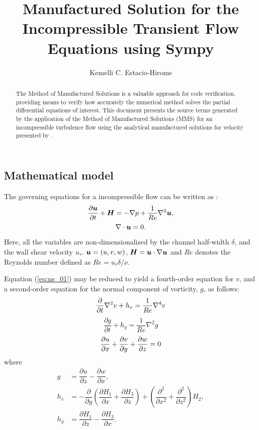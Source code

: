 \documentclass[10pt]{article}
\title{Manufactured Solution for the Incompressible Transient Flow Equations using Sympy}
\author{Kemelli C. Estacio-Hiroms}
\newcommand{\diff}[2] {\dfrac{\partial #1}{\partial #2}}
\newcommand{\bv}[1]{\ensuremath{\mbox{\boldmath$ #1 $}}}
\begin{document}
\begin{landscape}
	
\maketitle

\begin{abstract}
The Method of Manufactured Solutions is a valuable approach for code verification, providing means to verify how accurately the numerical method solves the partial differential equations of interest.
This document presents the source terms generated by the application of the Method of Manufactured Solutions (MMS) for an incompressible turbulence flow  using the analytical manufactured solutions for velocity presented by \citet{Rhys2011}.
\end{abstract}





\section{Mathematical model}
The governing equations for a incompressible flow can be written as \citep{Kim1987}:
\begin{equation}
 \label{eq:ns_01}
\diff{\bv{u}}{t}  +\bv{H}= -\nabla p+  \dfrac{1}{Re}\nabla^2 \bv{u},
\end{equation}
\begin{equation}
 \label{eq:ns_02}
\nabla \cdot \bv{u} = 0.
\end{equation}

Here, all the variables are non-dimensionalized by the channel half-width $\delta$, and the wall shear velocity $u_\tau$. $\bv{u}=(u,v,w)$, $\bv{H}=\bv{u}\cdot\nabla\bv{u}$ and $Re$ denotes the Reynolds number defined as $Re=u_\tau  \delta / \nu$.


Equation (\ref{eq:ns_01}) may be reduced to yield a fourth-order equation for $v$, and a second-order equation for the normal component of vorticity, $g$, as follows:
\begin{equation}
\label{eq:ns_03}
\diff{}{t}\nabla^2 v +h_v  = \dfrac{1}{Re} \nabla^4 v\\
\end{equation}
\begin{equation}
\label{eq:ns_04}
\diff{g}{t} + h_g = \dfrac{1}{Re} \nabla^2 g
\end{equation}
\begin{equation}
\label{eq:ns_05}
\diff{u}{x}+\diff{v}{y}+\diff{w}{z}=0\\
\end{equation}
where
\begin{equation}
\begin{split}
g&=\diff{u}{z}-\diff{w}{x},\\
h_v&=-\diff{}{y}\left( \diff{H_1}{x}+\diff{H_3}{z}\right) + \left( \diff{^2}{x^2} + \diff{^2}{z^2}\right) H_2,	\\
h_g&= \diff{H_1}{z}-\diff{H_3}{x}.
\end{split}
\end{equation}



\end{landscape}
\end{document}
